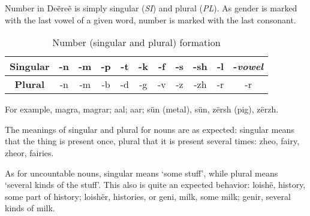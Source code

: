 Number in Deẽreẽ is simply singular (\emph{SI}) and plural (\emph{PL}). As gender is marked with the
last vowel of a given word, number is marked with the last consonant.

\begin{table}[h]\label{tab:morph-number}
\begin{center}
\begin{tabular}{|c|cccccccccc|}
\hline
\textbf{Singular} & -n & -m & -p & -t & -k & -f & -s & -sh & -l & -\emph{vowel}\\\hline
\textbf{Plural}   & -n & -m & -b & -d & -g & -v & -z & -zh & -r & -r\\\hline
\end{tabular}
\end{center}
\caption{Number (singular and plural) formation}
\end{table}

For example, magra, magrar; aal; aar; \gls{sün} (metal), sün, 
\gls{zërsh} (pig), zërzh.

The meanings of singular and plural for nouns are as expected: singular means that the thing is
present once, plural that it is present several times: \gls{zheo}, fairy,
\gls{zheo}r, fairies.

As for uncountable nouns, singular means ‘some stuff’, while plural means ‘several kinds of the
stuff’. This also is quite an expected behavior: \gls{loishë}, history,
some part of history; \gls{loishë}r, histories, or \gls{geni}, milk, some milk;
\gls{geni}r, several kinds of milk.

